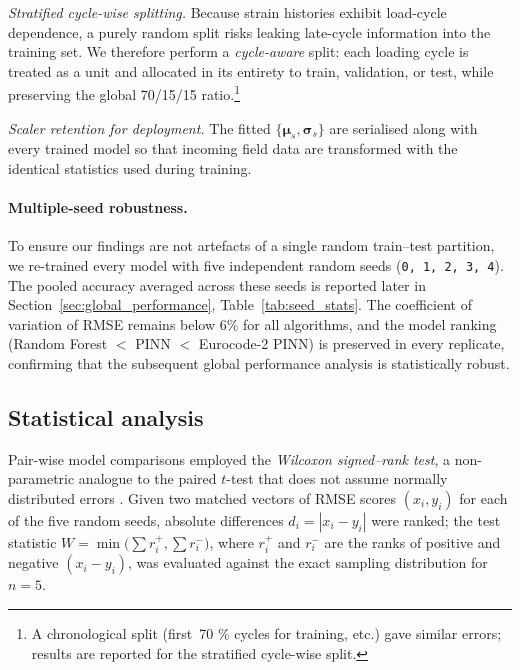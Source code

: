 \documentclass{article}
\begin{document}
\smallskip
\emph{Stratified \emph{cycle-wise} splitting.}  
Because strain histories exhibit load-cycle dependence, a purely random split
risks leaking late-cycle information into the training set.  
We therefore perform a \emph{cycle-aware} split: each loading cycle is treated as
a unit and allocated in its entirety to train, validation, or test, while
preserving the global 70/15/15 ratio.\footnote{%
  A chronological split (first~70 \% cycles for training, etc.) gave similar
  errors; results are reported for the stratified cycle-wise split.}

\smallskip
\emph{Scaler retention for deployment.}  
The fitted $\{\boldsymbol{\mu}_s,\boldsymbol{\sigma}_s\}$ are serialised along
with every trained model so that incoming field data are transformed with the
identical statistics used during training.

\paragraph{Multiple-seed robustness.}
To ensure our findings are not artefacts of a single random train--test
partition, we re-trained every model with five independent random seeds
(\texttt{0, 1, 2, 3, 4}).  The pooled accuracy averaged across these seeds is
reported later in Section~\ref{sec:global_performance},
Table~\ref{tab:seed_stats}.  The coefficient of variation of RMSE remains
below $6\%$ for all algorithms, and the model ranking (Random Forest
$<$ PINN $<$ Eurocode-2 PINN) is preserved in every replicate, confirming that
the subsequent global performance analysis is statistically robust.




\subsection{Statistical analysis}
\label{subsec:stats_methods}


Pair-wise model comparisons employed the \emph{Wilcoxon
signed–rank test}, a non-parametric analogue to the paired $t$-test that
does not assume normally distributed errors
\citep{Wilcoxon1945,McDonald2014}. Given two matched vectors of RMSE
scores $(x_i,y_i)$ for each of the five random seeds, absolute
differences $d_i=|x_i-y_i|$ were ranked; the test statistic
$W=\min\bigl(\sum r_i^{+},\sum r_i^{-}\bigr)$, where $r_i^{+}$ and
$r_i^{-}$ are the ranks of positive and negative
$(x_i-y_i)$, was evaluated against the exact sampling distribution for
$n=5$.
\end{document}
